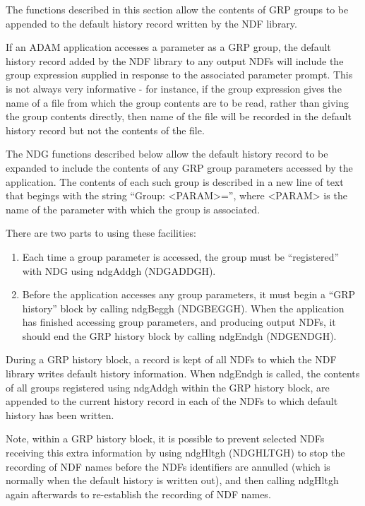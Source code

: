 \documentclass[twoside,11pt]{article}
\renewcommand{\_}{\texttt{\symbol{95}}}
\begin{document}
The functions described in this section allow the contents of GRP
groups to be appended to the default history record written by the
NDF library.

If an ADAM application accesses a parameter as a GRP group, the default
history record added by the NDF library to any output NDFs will include
the group expression supplied in response to the associated parameter
prompt. This is not always very informative - for instance, if the group
expression gives the name of a file from which the group contents are to
be read, rather than giving the group contents directly, then name of the
file will be recorded in the default history record but not the contents
of the file.

The NDG functions described below allow the default history record to be
expanded to include the contents of any GRP group parameters accessed by
the application. The contents of each such group is described in a new
line of text that begings with the string ``Group: <PARAM>='', where
<PARAM> is the name of the parameter with which the group is associated.

There are two parts to using these facilities:

\begin{enumerate}
\item Each time a group parameter is accessed, the group must be
``registered'' with NDG using ndgAddgh (NDG\_ADDGH).
\item Before the application accesses any group parameters, it must begin
a ``GRP history'' block by calling ndgBeggh (NDG\_BEGGH). When the
application has finished accessing group parameters, and producing output
NDFs, it should end the GRP history block by calling ndgEndgh (NDG\_ENDGH).
\end{enumerate}

During a GRP history block, a record is kept of all NDFs to which the NDF
library writes default history information. When ndgEndgh is called, the
contents of all groups registered using ndgAddgh within the GRP history
block, are appended to the current history record in each of the NDFs to
which default history has been written.

Note, within a GRP history block, it is possible to prevent selected NDFs
receiving this extra information by using ndgHltgh (NDG\_HLTGH) to stop
the recording of NDF names before the NDFs identifiers are annulled
(which is normally when the default history is written out), and then
calling ndgHltgh again afterwards to re-establish the recording of NDF
names.
\end{document}

